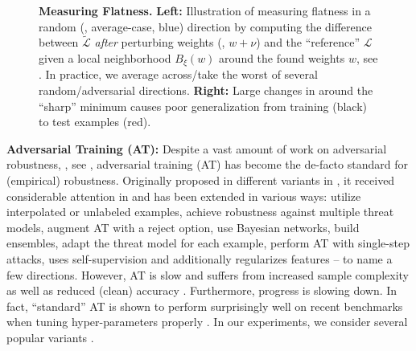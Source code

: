 \begin{figure}[t]
\begin{minipage}[t]{0.12\textwidth}
	\end{minipage}
	\vspace*{-10px}
	\caption{\textbf{Measuring Flatness.} \textbf{Left:} Illustration of measuring flatness in a random (\ie, average-case, {\color{colorbrewer2}blue}) direction by computing the difference between \RCE $\tilde{\mathcal{L}}$ \emph{after} perturbing weights (\ie, $w + \nu$) and the ``reference'' \RCE $\mathcal{L}$ given a local neighborhood $B_\xi(w)$ around the found weights $w$, see . In practice, we average across/take the worst of several random/adversarial directions.
	\textbf{Right:} Large changes in \RCE around the ``sharp'' minimum causes poor generalization from training ({\color{colorbrewer0}black}) to test examples ({\color{colorbrewer1}red}).
	}
	\label{fig:main-illustration}
	\vspace*{-6px}
\end{figure}

\textbf{Adversarial Training (AT):}
Despite a vast amount of work on adversarial robustness, \eg, see \cite{SilvaARXIV2020,YuanARXIV2017,AkhtarACCESS2018,BiggioCCS2018,XuARXIV2019}, adversarial training (AT) has become the de-facto standard for (empirical) robustness. Originally proposed in different variants in \cite{SzegedyICLR2014,MiyatoICLR2016,HuangARXIV2015}, it received considerable attention in \cite{MadryICLR2018,robustness} and has been extended in various ways:
\cite{LambAISEC2019,CarmonNIPS2019,UesatoNIPS2019} utilize interpolated or unlabeled examples, \cite{TramerNIPS2019,MainiICML2020} achieve robustness against multiple threat models, \cite{StutzICML2020,LaidlawARXIV2019,WuICML2018} augment AT with a reject option, \cite{YeNIPS2018,LiuICLR2019b} use Bayesian networks, \cite{TramerICLR2018,GrefenstetteARXIV2018} build ensembles, \cite{BalajiARXIV2019,DingICLR2020} adapt the threat model for each example, \cite{Wong2020ICLR,AndriushchenkoNIPS2020,VivekCVPR2020} perform AT with single-step attacks, \cite{HendrycksNIPS2019} uses self-supervision and \cite{PangNIPS2020} additionally regularizes features  -- to name a few directions. However, AT is slow \cite{ZhangNIPS2020} and suffers from increased sample complexity \cite{SchmidtNIPS2018} as well as reduced (clean) accuracy \cite{TsiprasICLR2019,StutzCVPR2019,ZhangICML2019,RaghunathanARXIV2019}. Furthermore, progress is slowing down. In fact, ``standard'' AT is shown to perform surprisingly well on recent benchmarks \cite{CroceICML2020,CroceARXIV2020b} when tuning hyper-parameters properly \cite{PangARXIV2020b,GowalARXIV2020}. In our experiments, we consider several popular variants \cite{WuNIPS2020,WangICLR2020,ZhangICML2019,CarmonNIPS2019,HendrycksNIPS2019}.


